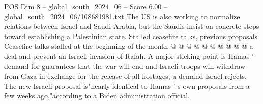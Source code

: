 \begin{textsample}{POS Dim 8 – global\_south\_2024\_06 – Score 6.00 – global\_south\_2024\_06/108681981.txt}
The US is also working to normalize relations between Israel and Saudi Arabia, but the Saudis insist on concrete steps toward establishing a Palestinian state.
Stalled ceasefire talks, previous proposals Ceasefire talks stalled at the beginning of the month @ @ @ @ @ @ @ @ @ @ a deal and prevent an Israeli invasion of Rafah.
A major sticking point is Hamas ' demand for guarantees that the war will end and Israeli troops will withdraw from Gaza in exchange for the release of all hostages, a demand Israel rejects.
The new Israeli proposal is"nearly identical to Hamas ' s own proposals from a few weeks ago,"according to a Biden administration official.

\end{textsample}
